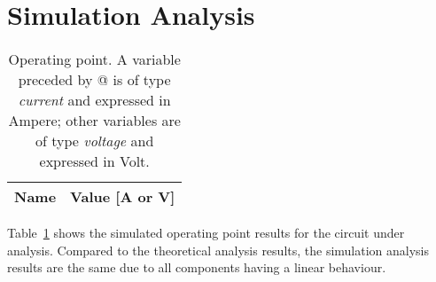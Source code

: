\section{Simulation Analysis}
\label{sec:simulation}


\begin{table}[h]
  \centering
  \begin{tabular}{|l|r|}
    \hline    
    {\bf Name} & {\bf Value [A or V]} \\ \hline
    
  \end{tabular}
  \caption{Operating point. A variable preceded by @ is of type {\em current}
    and expressed in Ampere; other variables are of type {\it voltage} and expressed in
    Volt.}
  \label{tab:tabela3}
\end{table}



Table~\ref{tab:tabela3} shows the simulated operating point results for the circuit
under analysis. Compared to the theoretical analysis results, the simulation analysis results are the same
due to all components having a linear behaviour.




